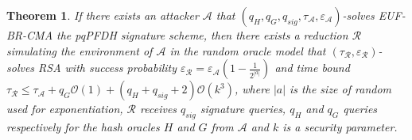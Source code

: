 \documentclass[a4paper,11pt]{article}
\newtheorem{theorem}{Theorem}[section]
\begin{document}
\begin{theorem}
If there exists an attacker $\mathcal{A}$ that    $(q_{H}, q_{G} , q_{sig} , \tau_{\mathcal{A}} ,\varepsilon_{\mathcal{A}} )$-solves
EUF-BR-CMA the pqPFDH signature scheme, then there exists a reduction $\mathcal{R}$ simulating the environment of $\mathcal{A}$ in the random oracle model that  $(\tau_{\mathcal{R}} ,\varepsilon_{\mathcal{R}} )$-solves RSA with  success  probability $\varepsilon_{\mathcal{R}} = \varepsilon_{\mathcal{A}}(1-\frac{1}{2^{|a|}}) $   and time bound $\tau_{\mathcal{R}}\leq \tau_{\mathcal{A}} + q_{G}\mathcal{O}(1) + (q_{H}+ q_{sig}+2)\mathcal{O}(k^{3})$, where $|a|$ is the size of random  used for exponentiation,  $\mathcal{R}$ receives $q_{sig}$ signature queries, $q_{H}$ and $q_{G}$ queries respectively for the hash oracles $H$ and $G$ from  $\mathcal{A}$ and  $k$ is a security parameter.

\end{theorem}
\end{document}
